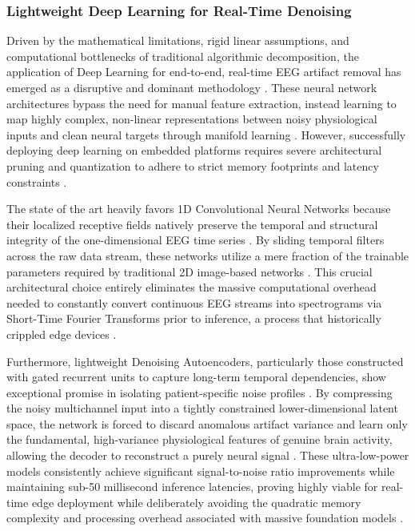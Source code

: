 \subsubsection{Lightweight Deep Learning for Real-Time Denoising}

Driven by the mathematical limitations, rigid linear assumptions, and computational bottlenecks of traditional algorithmic decomposition, the application of Deep Learning for end-to-end, real-time EEG artifact removal has emerged as a disruptive and dominant methodology \cite{azhar2024convolutional}. These neural network architectures bypass the need for manual feature extraction, instead learning to map highly complex, non-linear representations between noisy physiological inputs and clean neural targets through manifold learning \cite{xiong2024general}. However, successfully deploying deep learning on embedded platforms requires severe architectural pruning and quantization to adhere to strict memory footprints and latency constraints \cite{popa2026end}.

The state of the art heavily favors 1D Convolutional Neural Networks because their localized receptive fields natively preserve the temporal and structural integrity of the one-dimensional EEG time series \cite{ige2024state}.  By sliding temporal filters across the raw data stream, these networks utilize a mere fraction of the trainable parameters required by traditional 2D image-based networks \cite{saha2025time}. This crucial architectural choice entirely eliminates the massive computational overhead needed to constantly convert continuous EEG streams into spectrograms via Short-Time Fourier Transforms prior to inference, a process that historically crippled edge devices \cite{nayana2025eeg}.

Furthermore, lightweight Denoising Autoencoders, particularly those constructed with gated recurrent units to capture long-term temporal dependencies, show exceptional promise in isolating patient-specific noise profiles \cite{zhang2022two}. By compressing the noisy multichannel input into a tightly constrained lower-dimensional latent space, the network is forced to discard anomalous artifact variance and learn only the fundamental, high-variance physiological features of genuine brain activity, allowing the decoder to reconstruct a purely neural signal \cite{chuang2022icunet}. These ultra-low-power models consistently achieve significant signal-to-noise ratio improvements while maintaining sub-50 millisecond inference latencies, proving highly viable for real-time edge deployment while deliberately avoiding the quadratic memory complexity and processing overhead associated with massive foundation models \cite{xing2024deep}.

